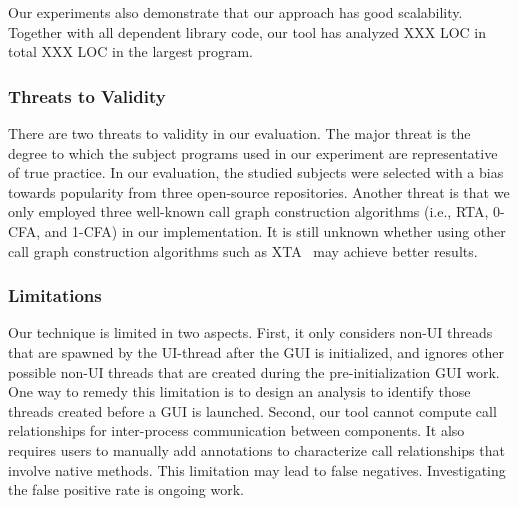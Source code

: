 Our experiments also demonstrate that our approach has good scalability.
Together with all dependent library code, our tool has analyzed
XXX LOC in total  XXX LOC in the largest program.



\subsubsection{Threats to Validity}

There are two threats to validity in our evaluation. 
The major threat is the degree to which the subject programs
used in our experiment are representative of true practice.
In our evaluation, the studied subjects were selected with a bias towards popularity from
three open-source repositories. Another threat is that we only employed three
well-known call graph construction algorithms (i.e., RTA, 0-CFA, and 1-CFA) 
in our implementation. It is still unknown whether using other 
call graph construction algorithms such as XTA~\cite{xta} may achieve better results.

\subsubsection{Limitations}

Our technique is limited in two aspects. First, it only considers
non-UI threads that are spawned by the UI-thread after the GUI
is initialized, and ignores other possible non-UI threads
that are created during the pre-initialization GUI work. One way
to remedy this limitation is to design an analysis to identify
those threads created before a GUI is launched.
Second, our tool cannot compute call relationships
for inter-process communication between components. It also
requires users to manually add annotations to characterize
call relationships that involve native methods. This limitation
may lead to false negatives. Investigating the false positive
rate is ongoing work.




